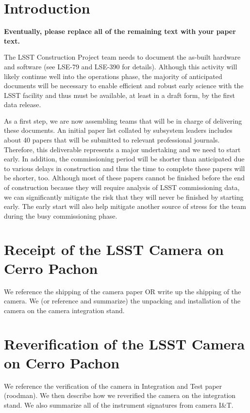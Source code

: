 \section{Introduction}

{\bf Eventually, please replace all of the remaining text with your paper text.}
\vskip 0.4in


The LSST Construction Project team needs to document the as-built hardware and software
(see LSE-79 and LSE-390 for details). Although this activity will likely continue well into the operations phase, the majority 
of anticipated documents will be necessary to enable efficient and robust early science with the LSST 
facility and thus must be available, at least in a draft form, by the first data release. 

As a first step, we are now assembling teams that will be in charge of delivering these documents.
An initial paper list collated by subsystem leaders includes about 40 papers that will be submitted 
to relevant professional journals. Therefore, this deliverable represents a major undertaking
and we need to start early. In addition, the commissioning period will be shorter than anticipated 
due to various delays in construction  and thus the time to complete these papers will be
shorter, too. Although most of these papers cannot be finished before the end of construction 
because they will require analysis of LSST commissioning data, we can significantly mitigate
the risk that they will never be finished by starting early. The early start will also help 
mitigate another source of stress for the team during the busy commissioning phase. 

 
\section{Receipt of the LSST Camera on Cerro Pachon} 

We reference the shipping of the camera paper OR write up the shipping of the camera. We (or reference and summarize) the unpacking and installation of the camera on the camera integration stand.

\section{Reverification of the LSST Camera on Cerro Pachon} 

We reference the verification of the camera in Integration and Test paper (roodman). We then describe how we reverified the camera on the integration stand. We also summarize all of the instrument signatures from camera I\&T.

